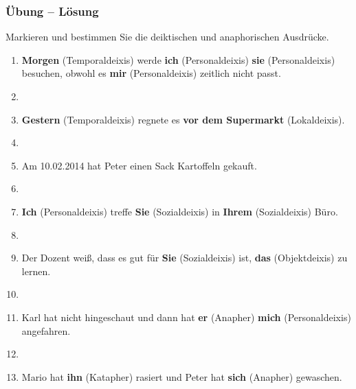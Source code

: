 
\begin{frame}
\frametitle{Übung -- Lösung}

Markieren und bestimmen Sie die deiktischen und anaphorischen Ausdrücke.
	
	\begin{enumerate}
		\item \textbf{Morgen} (Temporaldeixis) werde \textbf{ich} (Personaldeixis) \textbf{sie} (Personaldeixis) besuchen, obwohl es \textbf{mir} (Personaldeixis) zeitlich nicht passt.
		\item[]
		\item \textbf{Gestern} (Temporaldeixis) regnete es \textbf{vor dem Supermarkt} (Lokaldeixis).
		\item[]
		\item Am 10.02.2014 hat Peter einen Sack Kartoffeln gekauft.
		\item[]
		\item \textbf{Ich} (Personaldeixis) treffe \textbf{Sie} (Sozialdeixis) in \textbf{Ihrem} (Sozialdeixis) Büro.
		\item[]
		\item Der Dozent wei\ss{}, dass es gut für \textbf{Sie} (Sozialdeixis) ist, \textbf{das} (Objektdeixis) zu lernen.
		\item[]
		\item Karl hat nicht hingeschaut und dann hat \textbf{er} (Anapher) \textbf{mich} (Personaldeixis) angefahren.
		\item[]
		\item Mario hat \textbf{ihn} (Katapher) rasiert und Peter hat \textbf{sich} (Anapher) gewaschen.
	\end{enumerate}     

\end{frame}